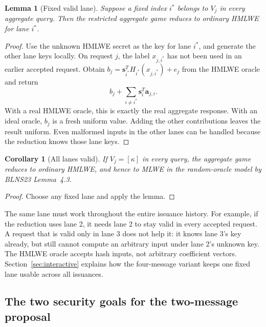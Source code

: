 \documentclass[10pt]{article}
\newtheorem{lemma}{Lemma}
\newtheorem{corollary}{Corollary}
\begin{document}
\begin{lemma}[Fixed valid lane]
Suppose a fixed index $i^*$ belongs to $V_j$ in every aggregate query.  Then
the restricted aggregate game reduces to ordinary HMLWE for lane $i^*$.
\end{lemma}

\begin{proof}
Use the unknown HMLWE secret as the key for lane $i^*$, and generate the
other lane keys locally.  On request $j$, the label $x_{j,i^*}$ has not been
used in an earlier accepted request.  Obtain
$b_j=\mathbf s_{i^*}^T H_{i^*}(x_{j,i^*})+e_j$ from the HMLWE oracle and return
\[
 b_j+\sum_{i\ne i^*}\mathbf s_i^T\mathbf a_{j,i}.
\]
With a real HMLWE oracle, this is exactly the real aggregate response.  With
an ideal oracle, $b_j$ is a fresh uniform value.  Adding the other
contributions leaves the result uniform.  Even malformed inputs in the
other lanes can be handled because the reduction knows those lane keys.
\end{proof}

\begin{corollary}[All lanes valid]
If $V_j=[\kappa]$ in every query, the aggregate game reduces to ordinary
HMLWE, and hence to MLWE in the random-oracle model by BLNS23 Lemma~4.3.
\end{corollary}

\begin{proof}
Choose any fixed lane and apply the lemma.
\end{proof}

The same lane must work throughout the entire issuance history.  For example,
if the reduction uses lane 2, it needs lane 2 to stay valid in every accepted
request.  A request that is valid only in lane 3 does not help it: it knows
lane 3's key already, but still cannot compute an arbitrary input under lane
2's unknown key.  The HMLWE oracle accepts hash inputs, not arbitrary
coefficient vectors.  Section~\ref{sec:interactive} explains how the
four-message variant keeps one fixed lane usable across all issuances.

\subsection{The two security goals for the two-message proposal}
\end{document}
